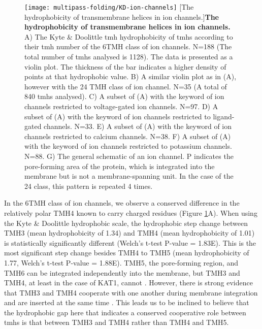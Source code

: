 \begin{figure}[!ht]
\centering
\texttt{[image: multipass-folding/KD-ion-channels]}
		[The hydrophobicity of transmembrane helices in ion channels.]{\textbf{The hydrophobicity of transmembrane helices in ion channels.}
    A) The Kyte \& Doolittle \gls{tmh} hydrophobicity of \gls{tmh}s according to their \gls{tmh} number of the 6TMH class of ion channels.
    N=188 (The total number of \gls{tmh}s analysed is 1128).
    The data is presented as a violin plot.
    The thickness of the bar indicates a higher density of points at that hydrophobic value.
    B) A similar violin plot as in (A), however with the 24 TMH class of ion channel.
    N=35 (A total of 840 \gls{tmh}s analysed).
    C) A subset of (A) with the keyword of ion channels restricted to voltage\--gated ion channels.
    N=97.
    D) A subset of (A) with the keyword of ion channels restricted to ligand\--gated channels.
    N=33.
    E) A subset of (A) with the keyword of ion channels restricted to calcium channels.
    N=38.
    F) A subset of (A) with the keyword of ion channels restricted to potassium channels.
    N=88.
    G) The general schematic of an ion channel.
    P indicates the pore\--forming area of the protein, which is integrated into the membrane but is not a membrane\--spanning unit.
    In the case of the 24 class, this pattern is repeated 4 times.
    }

\label{fig:KD-ion-channels}
\end{figure}

In the 6TMH class of ion channels, we observe a conserved difference in the relatively polar TMH4 known to carry charged residues (Figure \ref{fig:KD-ion-channels}A).
When using the Kyte \& Doolittle hydrophobic scale, the hydrophobic step change between TMH3 (mean hydrophobicity of 1.34) and TMH4 (mean hydrophobicity of 1.01) is statistically significantly different (Welch's t\--test P\--value = 1.83E).
This is the most significant step change besides TMH4 to TMH5 (mean hydrophobicity of 1.77, Welch's t\--test P\--value = 1.88E).
TMH5, the pore\--forming region, and TMH6 can be integrated independently into the membrane, but TMH3 and TMH4, at least in the case of KAT1, cannot \cite{Sato2002}.
However, there is strong evidence that TMH3 and TMH4 cooperate with one another during membrane integration and are inserted at the same time \cite{Sato2002, Sato2003, Zhang2007, Cymer2015}.
This leads us to be inclined to believe that the hydrophobic gap here that indicates a conserved cooperative role between \gls{tmh}s is that between TMH3 and TMH4 rather than TMH4 and TMH5.



